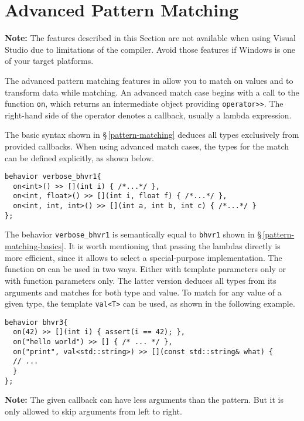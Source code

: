 \section{Advanced Pattern Matching}
\label{advanced-pattern-matching}

\textbf{Note:} The features described in this Section are not available when using Visual Studio due to limitations of the compiler.
Avoid those features if Windows is one of your target platforms.

The advanced pattern matching features in \lib allow you to match on values and to transform data while matching.
An advanced match case begins with a call to the function \lstinline^on^, which returns an intermediate object providing \lstinline^operator>>^.
The right-hand side of the operator denotes a callback, usually a lambda expression.

The basic syntax shown in \S\,\ref{pattern-matching} deduces all types exclusively from provided callbacks.
When using advanced match cases, the types for the match can be defined explicitly, as shown below.

\begin{lstlisting}
behavior verbose_bhvr1{
  on<int>() >> [](int i) { /*...*/ },
  on<int, float>() >> [](int i, float f) { /*...*/ },
  on<int, int, int>() >> [](int a, int b, int c) { /*...*/ }
};
\end{lstlisting}

The behavior \lstinline^verbose_bhvr1^ is semantically equal to \lstinline^bhvr1^ shown in \S\,\ref{pattern-matching-basics}.
It is worth mentioning that passing the lambdas directly is more efficient, since it allows \lib to select a special-purpose implementation.
The function \lstinline^on^ can be used in two ways.
Either with template parameters only or with function parameters only.
The latter version deduces all types from its arguments and matches for both type and value.
To match for any value of a given type, the template \lstinline^val<T>^ can be used, as shown in the following example.

\begin{lstlisting}
behavior bhvr3{
  on(42) >> [](int i) { assert(i == 42); },
  on("hello world") >> [] { /* ... */ },
  on("print", val<std::string>) >> [](const std::string& what) {
  // ...
  }
};
\end{lstlisting}

\textbf{Note:} The given callback can have less arguments than the pattern.
But it is only allowed to skip arguments from left to right.


